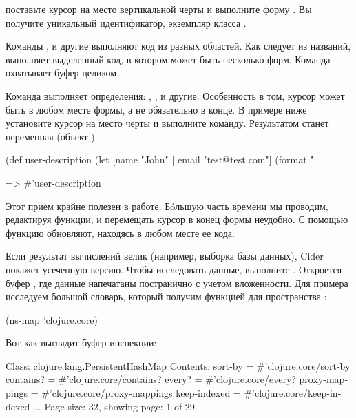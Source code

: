 \noindent
поставьте курсор на место вертикальной черты и выполните форму . Вы получите уникальный идентификатор, экземпляр класса .

Команды ,  и другие выполняют код из разных областей. Как следует из названий,  выполняет выделенный код, в котором может быть несколько форм. Команда  охватывает буфер целиком.

Команда  выполняет определения: , ,  и другие. Особенность в том, курсор может быть в любом месте формы, а не обязательно в конце. В примере ниже установите курсор на место черты и выполните команду. Результатом станет переменная  (объект ).

\begin{english}
  \begin{clojure}
(def user-description
  (let [name "John" |
        email "test@test.com"]
    (format "%

=> #'user-description
  \end{clojure}
\end{english}

Этот прием крайне полезен в работе. Бóльшую часть времени мы проводим, редактируя функции, и перемещать курсор в конец формы неудобно. С помощью  функцию обновляют, находясь в любом месте ее кода.

Если результат вычислений велик (например, выборка базы данных), Cider покажет усеченную версию. Чтобы исследовать данные, выполните . Откроется буфер , где данные напечатаны постранично с учетом вложенности. Для примера исследуем большой словарь, который получим функцией  для пространства :

\begin{english}
  \begin{text}
(ns-map 'clojure.core)
  \end{text}
\end{english}

Вот как выглядит буфер инспекции:

\begin{english}
  \begin{text}
Class: clojure.lang.PersistentHashMap
Contents:
  sort-by = #'clojure.core/sort-by
  contains? = #'clojure.core/contains?
  every? = #'clojure.core/every?
  proxy-mappings = #'clojure.core/proxy-mappings
  keep-indexed = #'clojure.core/keep-indexed
  ...
  Page size: 32, showing page: 1 of 29
  \end{text}
\end{english}

